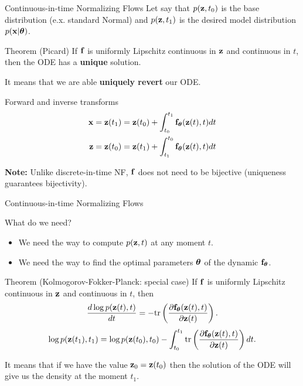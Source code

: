 \begin{frame}{Continuous-in-time Normalizing Flows}
	Let say that $p(\mathbf{z}, t_0)$ is the base distribution (e.x. standard Normal) and $p(\mathbf{z}, t_1)$ is the desired model distribution $p(\mathbf{x} | \boldsymbol{\theta})$.
	\begin{block}{Theorem (Picard)}
		If $\mathbf{f}$ is uniformly Lipschitz continuous in $\mathbf{z}$ and continuous in $t$, then the ODE has a \textbf{unique} solution.
	\end{block}
	It means that we are able \textbf{uniquely revert} our ODE. 
	\begin{block}{Forward and inverse transforms}
		\vspace{-0.7cm}
		\begin{align*}
			\mathbf{x} &= \mathbf{z}(t_1) = \mathbf{z}(t_0) + \int_{t_0}^{t_1} \mathbf{f}_{\boldsymbol{\theta}}(\mathbf{z}(t), t) dt \\
			\mathbf{z} &= \mathbf{z}(t_0) = \mathbf{z}(t_1) + \int_{t_1}^{t_0} \mathbf{f}_{\boldsymbol{\theta}}(\mathbf{z}(t), t) dt
		\end{align*}
		\vspace{-0.7cm}
	\end{block}
	\textbf{Note:} Unlike discrete-in-time NF, $\mathbf{f}$ does not need to be bijective (uniqueness guarantees bijectivity).
\end{frame}
\begin{frame}{Continuous-in-time Normalizing Flows}
	\begin{block}{What do we need?}
		\begin{itemize}
			\item We need the way to compute $p(\mathbf{z}, t)$ at any moment $t$.
			\item We need the way to find the optimal parameters $\boldsymbol{\theta}$ of the dynamic $\mathbf{f}_{\boldsymbol{\theta}}$.
		\end{itemize}
	\end{block}
	\vspace{-0.3cm}
	\begin{block}{Theorem (Kolmogorov-Fokker-Planck: special case)}
		If $\mathbf{f}$ is uniformly Lipschitz continuous in $\mathbf{z}$ and continuous in $t$, then
		\[
			\frac{d \log p(\mathbf{z}(t), t)}{d t} = - \text{tr} \left( \frac{\partial \mathbf{f}_{\boldsymbol{\theta}}(\mathbf{z}(t), t)}{\partial \mathbf{z}(t)} \right).
		\]
		\[
			\log p(\mathbf{z}(t_1), t_1) = \log p(\mathbf{z}(t_0), t_0) - \int_{t_0}^{t_1} \text{tr}  \left( \frac{\partial \mathbf{f}_{\boldsymbol{\theta}}(\mathbf{z}(t), t)}{\partial \mathbf{z}(t)} \right) dt.
		\]
	\end{block}
	It means that if we have the value $\mathbf{z}_0 = \mathbf{z}(t_0)$ then the solution of the ODE will give us the density at the moment $t_1$.
\end{frame}
